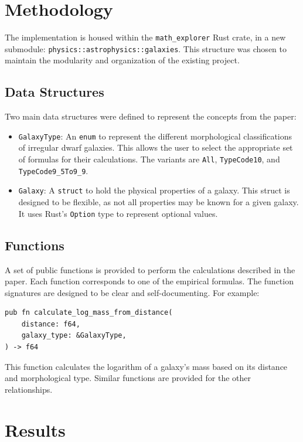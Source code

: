 \documentclass{article}
\begin{document}
\section{Methodology}

The implementation is housed within the \texttt{math_explorer} Rust crate, in a new submodule: \texttt{physics::astrophysics::galaxies}. This structure was chosen to maintain the modularity and organization of the existing project.

\subsection{Data Structures}

Two main data structures were defined to represent the concepts from the paper:

\begin{itemize}
    \item \texttt{GalaxyType}: An \texttt{enum} to represent the different morphological classifications of irregular dwarf galaxies. This allows the user to select the appropriate set of formulas for their calculations. The variants are \texttt{All}, \texttt{TypeCode10}, and \texttt{TypeCode9\_5To9\_9}.
    \item \texttt{Galaxy}: A \texttt{struct} to hold the physical properties of a galaxy. This struct is designed to be flexible, as not all properties may be known for a given galaxy. It uses Rust's \texttt{Option} type to represent optional values.
\end{itemize}

\subsection{Functions}

A set of public functions is provided to perform the calculations described in the paper. Each function corresponds to one of the empirical formulas. The function signatures are designed to be clear and self-documenting. For example:

\begin{verbatim}
pub fn calculate_log_mass_from_distance(
    distance: f64,
    galaxy_type: &GalaxyType,
) -> f64
\end{verbatim}

This function calculates the logarithm of a galaxy's mass based on its distance and morphological type. Similar functions are provided for the other relationships.

\section{Results}
\end{document}
